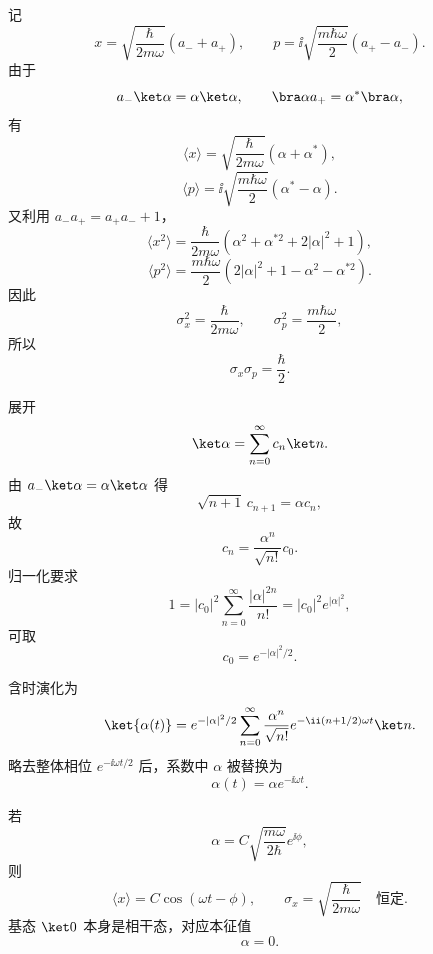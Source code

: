 \begin{solution}
记
\[
x=\sqrt{\frac{\hbar}{2m\omega}}(a_-+a_+),
\qquad
p=\ii\sqrt{\frac{m\hbar\omega}{2}}(a_+-a_-).
\]
由于
\[
a_-\ket\alpha=\alpha\ket\alpha,
\qquad
\bra\alpha a_+=\alpha^*\bra\alpha,
\]
有
\[
\langle x\rangle=\sqrt{\frac{\hbar}{2m\omega}}(\alpha+\alpha^*),
\]
\[
\langle p\rangle=\ii\sqrt{\frac{m\hbar\omega}{2}}(\alpha^*-\alpha).
\]
又利用 $a_-a_+=a_+a_-+1$，
\[
\langle x^2\rangle=\frac{\hbar}{2m\omega}
\left(\alpha^2+\alpha^{*2}+2|\alpha|^2+1\right),
\]
\[
\langle p^2\rangle=\frac{m\hbar\omega}{2}
\left(2|\alpha|^2+1-\alpha^2-\alpha^{*2}\right).
\]
因此
\[
\sigma_x^2=\frac{\hbar}{2m\omega},
\qquad
\sigma_p^2=\frac{m\hbar\omega}{2},
\]
所以
\[
\boxed{\sigma_x\sigma_p=\frac\hbar2.}
\]

展开
\[
\ket\alpha=\sum_{n=0}^{\infty}c_n\ket n.
\]
由 $a_-\ket\alpha=\alpha\ket\alpha$ 得
\[
\sqrt{n+1}\,c_{n+1}=\alpha c_n,
\]
故
\[
\boxed{c_n=\frac{\alpha^n}{\sqrt{n!}}c_0.}
\]
归一化要求
\[
1=|c_0|^2\sum_{n=0}^{\infty}\frac{|\alpha|^{2n}}{n!}
=|c_0|^2e^{|\alpha|^2},
\]
可取
\[
\boxed{c_0=e^{-|\alpha|^2/2}.}
\]

含时演化为
\[
\ket{\alpha(t)}=e^{-|\alpha|^2/2}
\sum_{n=0}^{\infty}\frac{\alpha^n}{\sqrt{n!}}e^{-\ii(n+1/2)\omega t}\ket n.
\]
略去整体相位 $e^{-\ii\omega t/2}$ 后，系数中 $\alpha$ 被替换为
\[
\boxed{\alpha(t)=\alpha e^{-\ii\omega t}.}
\]

若
\[
\alpha=C\sqrt{\frac{m\omega}{2\hbar}}e^{\ii\phi},
\]
则
\[
\boxed{\langle x\rangle=C\cos(\omega t-\phi)},
\qquad
\boxed{\sigma_x=\sqrt{\frac{\hbar}{2m\omega}}}\quad\text{恒定}.
\]
基态 $\ket0$ 本身是相干态，对应本征值
\[
\boxed{\alpha=0.}
\]
\end{solution}


